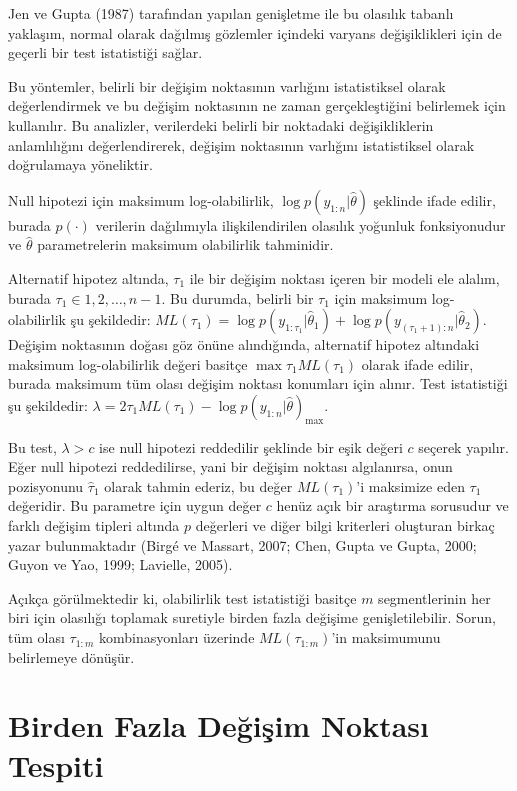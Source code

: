 \documentclass[12pt,twoside]{deuthesis}
\begin{document}
Jen ve Gupta (1987) tarafından yapılan genişletme ile bu olasılık tabanlı yaklaşım, normal olarak dağılmış gözlemler içindeki varyans değişiklikleri için de geçerli bir test istatistiği sağlar.

Bu yöntemler, belirli bir değişim noktasının varlığını istatistiksel olarak değerlendirmek ve bu değişim noktasının ne zaman gerçekleştiğini belirlemek için kullanılır. Bu analizler, verilerdeki belirli bir noktadaki değişikliklerin anlamlılığını değerlendirerek, değişim noktasının varlığını istatistiksel olarak doğrulamaya yöneliktir.

Null hipotezi için maksimum log-olabilirlik, \(\log p(y_{1:n}|\hat{\theta})\) şeklinde ifade edilir, burada \(p(\cdot)\) verilerin dağılımıyla ilişkilendirilen olasılık yoğunluk fonksiyonudur ve \(\hat{\theta}\) parametrelerin maksimum olabilirlik tahminidir.

Alternatif hipotez altında, \(\tau_1\) ile bir değişim noktası içeren bir modeli ele alalım, burada \(\tau_1 \in {1, 2, \dots, n - 1}\). Bu durumda, belirli bir \(\tau_1\) için maksimum log-olabilirlik şu şekildedir: \(ML(\tau_1) = \log p(y_{1:\tau_1}|\hat{\theta}_1) + \log p(y_{(\tau_1+1):n}|\hat{\theta}_2)\). Değişim noktasının doğası göz önüne alındığında, alternatif hipotez altındaki maksimum log-olabilirlik değeri basitçe \(\max{\tau_1} ML(\tau_1)\) olarak ifade edilir, burada maksimum tüm olası değişim noktası konumları için alınır. Test istatistiği şu şekildedir: \(\lambda = 2\tau_1 ML(\tau_1) - \log p(y_{1:n}|\hat{\theta})_{\max}\).

Bu test, \(\lambda > c\) ise null hipotezi reddedilir şeklinde bir eşik değeri \(c\) seçerek yapılır. Eğer null hipotezi reddedilirse, yani bir değişim noktası algılanırsa, onun pozisyonunu \(\hat{\tau}_1\) olarak tahmin ederiz, bu değer \(ML(\tau_1)\)'i maksimize eden \(\tau_1\) değeridir. Bu parametre için uygun değer \(c\) henüz açık bir araştırma sorusudur ve farklı değişim tipleri altında \(p\) değerleri ve diğer bilgi kriterleri oluşturan birkaç yazar bulunmaktadır (Birgé ve Massart, 2007; Chen, Gupta ve Gupta, 2000; Guyon ve Yao, 1999; Lavielle, 2005).

Açıkça görülmektedir ki, olabilirlik test istatistiği basitçe \(m\) segmentlerinin her biri için olasılığı toplamak suretiyle birden fazla değişime genişletilebilir. Sorun, tüm olası \(\tau_{1:m}\) kombinasyonları üzerinde \(ML(\tau_{1:m})\)'in maksimumunu belirlemeye dönüşür.

\section{Birden Fazla Değişim Noktası Tespiti}\label{birden-fazla-deux11fiux15fim-noktasux131-tespiti}
\end{document}

